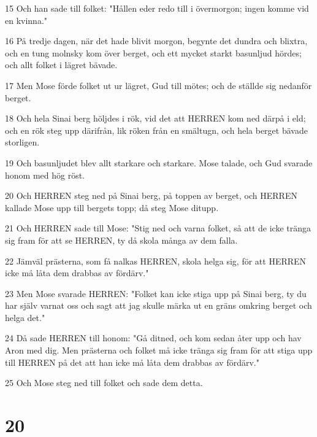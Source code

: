 \par 15 Och han sade till folket: "Hållen eder redo till i övermorgon; ingen komme vid en kvinna."
\par 16 På tredje dagen, när det hade blivit morgon, begynte det dundra och blixtra, och en tung molnsky kom över berget, och ett mycket starkt basunljud hördes; och allt folket i lägret bävade.
\par 17 Men Mose förde folket ut ur lägret, Gud till mötes; och de ställde sig nedanför berget.
\par 18 Och hela Sinai berg höljdes i rök, vid det att HERREN kom ned därpå i eld; och en rök steg upp därifrån, lik röken från en smältugn, och hela berget bävade storligen.
\par 19 Och basunljudet blev allt starkare och starkare. Mose talade, och Gud svarade honom med hög röst.
\par 20 Och HERREN steg ned på Sinai berg, på toppen av berget, och HERREN kallade Mose upp till bergets topp; då steg Mose ditupp.
\par 21 Och HERREN sade till Mose: "Stig ned och varna folket, så att de icke tränga sig fram för att se HERREN, ty då skola många av dem falla.
\par 22 Jämväl prästerna, som få nalkas HERREN, skola helga sig, för att HERREN icke må låta dem drabbas av fördärv."
\par 23 Men Mose svarade HERREN: "Folket kan icke stiga upp på Sinai berg, ty du har själv varnat oss och sagt att jag skulle märka ut en gräns omkring berget och helga det."
\par 24 Då sade HERREN till honom: "Gå ditned, och kom sedan åter upp och hav Aron med dig. Men prästerna och folket må icke tränga sig fram för att stiga upp till HERREN på det att han icke må låta dem drabbas av fördärv."
\par 25 Och Mose steg ned till folket och sade dem detta.

\chapter{20}

